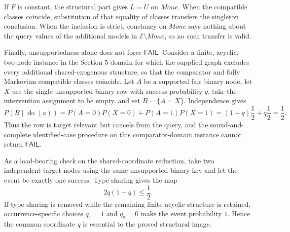 If \(F\) is constant, the structural part gives \(L=U\) on \(Mone\).
When the compatible classes coincide, substitution of that equality of
classes transfers the singleton conclusion.  When the inclusion is
strict, constancy on \(Mone\) says nothing about the query values of the
additional models in \(\mathcal E\setminus Mone\), so no such transfer is
valid.

Finally, unsupportedness alone does not force
\(\mathsf{FAIL}\).  Consider a finite, acyclic, two-node instance in the
Section 5 domain for which the supplied graph excludes every additional
shared-exogenous structure, so that the comparator and fully Markovian
compatible classes coincide.  Let \(A\) be a supported fair binary node,
let \(X\) use the single unsupported binary row with success probability
\(q\), take the intervention assignment to be empty, and set
\(B=\{A=X\}\).  Independence gives
\[
 P(B\mid\operatorname{do}(a))
 =P(A=0)P(X=0)+P(A=1)P(X=1)
 =(1-q)\frac{1}{2}+q\frac{1}{2}=\frac{1}{2}.
\]
Thus the row is target relevant but cancels from the query, and the
sound-and-complete identified-case procedure on this comparator-domain
instance cannot return \(\mathsf{FAIL}\).

As a load-bearing check on the shared-coordinate reduction, take two
independent target nodes using the same unsupported binary key and let
the event be exactly one success.  Type sharing gives the map
\[
 2q(1-q)\leq\frac{1}{2}.
\]
If type sharing is removed while the remaining finite acyclic structure
is retained, occurrence-specific choices \(q_1=1\) and \(q_2=0\) make
the event probability \(1\).  Hence the common coordinate \(q\) is
essential to the proved structural image.
